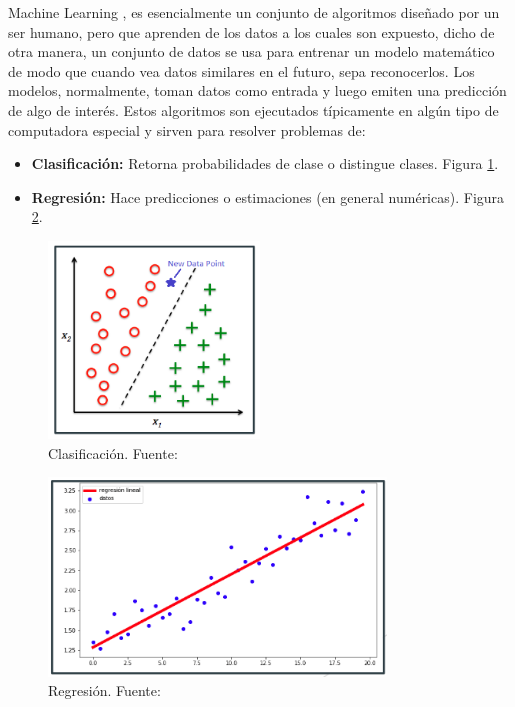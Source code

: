 Machine Learning \cite{ml}, es esencialmente un conjunto de algoritmos diseñado por un ser humano, pero que aprenden de los datos a los cuales son expuesto, dicho de otra manera, un conjunto de datos se usa para entrenar un modelo matemático de modo que cuando vea datos similares en el futuro, sepa reconocerlos. Los modelos, normalmente, toman datos como entrada y luego emiten una predicción de algo de interés. Estos algoritmos son ejecutados típicamente en algún tipo de computadora especial y sirven para resolver problemas de:
\begin{itemize}
    \item \textbf{Clasificación:} Retorna probabilidades de clase o distingue clases. Figura \ref{fig:clasificacion}.
    \item \textbf{Regresión:} Hace predicciones o estimaciones (en general numéricas). Figura \ref{fig:regresion}.
\end{itemize}

\begin{figure}[h!]
    \centering
    \includegraphics[width=0.5\textwidth]{img/clasificacion.png}
    \caption{Clasificación. Fuente: \cite{aprendisajesup}}
    \label{fig:clasificacion}
\end{figure}

\begin{figure}[h!]
    \centering
    \includegraphics[width=0.8\textwidth]{img/regresion.png}
    \caption{Regresión. Fuente: \cite{aprendisajesup}}
    \label{fig:regresion}
\end{figure}

